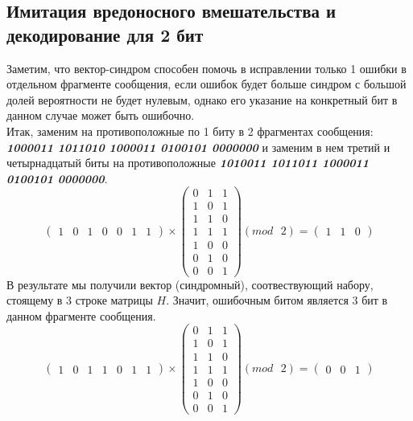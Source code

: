 \documentclass[a5paper, 10pt]{article}
\theoremstyle{definition}
\theoremstyle{plain}
\theoremstyle{remark}
\begin{document}
\subsection{Имитация вредоносного вмешательства и декодирование для 2 бит}
Заметим, что вектор-синдром способен помочь в исправлении только 1 ошибки в отдельном фрагменте сообщения, если ошибок будет больше синдром с большой долей вероятности не будет нулевым, однако его указание на конкретный бит в данном случае может быть ошибочно.\\
Итак, заменим на противоположные по 1 биту в 2 фрагментах сообщения:\\
 \textbf{\textit{10\colorbox[rgb]{0.50, 0.5, 0.5}{0}0011 101101\colorbox[rgb]{0.50, 0.5, 0.5}{0} 1000011 0100101 0000000}} и заменим в нем третий и четырнадцатый биты на противоположные  \textbf{\textit{10\colorbox[rgb]{0.4, 0.8, 0.8}{1}0011 101101\colorbox[rgb]{0.4, 0.8, 0.8}{1} 1000011 0100101 0000000}}.\\
\begin{equation}
\begin{pmatrix}
1 & 0 & 1 & 0 & 0 & 1 & 1
\end{pmatrix}
 \times
\begin{pmatrix}
0 & 1 & 1\\
1 & 0 & 1\\
1 & 1 & 0\\
1 & 1 & 1 \\
1 & 0 & 0\\
0 & 1 & 0 \\
0 & 0 & 1
\end{pmatrix}
(mod \text{ }2)
= \begin{pmatrix}
1 & 1 & 0 
\end{pmatrix}
\end{equation}
В результате мы получили вектор (синдромный), соотвествующий набору, стоящему в 3 строке матрицы $H$. Значит, ошибочным битом является 3 бит в данном фрагменте сообщения.\\
\begin{equation}
\begin{pmatrix}
1 & 0 & 1 & 1 & 0 & 1 & 1
\end{pmatrix}
 \times
\begin{pmatrix}
0 & 1 & 1\\
1 & 0 & 1\\
1 & 1 & 0\\
1 & 1 & 1 \\
1 & 0 & 0\\
0 & 1 & 0 \\
0 & 0 & 1
\end{pmatrix}
(mod \text{ }2)
= \begin{pmatrix}
0 & 0 & 1 
\end{pmatrix}
\end{equation}
\end{document}
